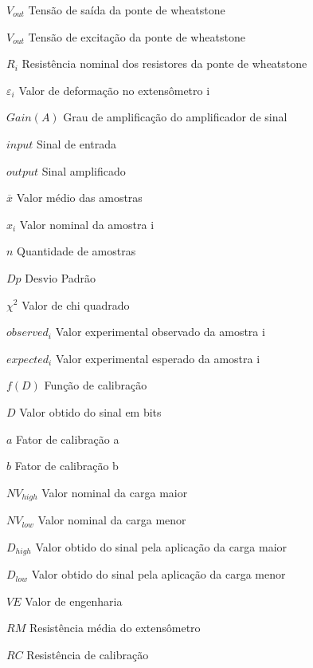 \begin{simbolos}
    \item[$ V_{out} $] {Tensão de saída da ponte de wheatstone}
    \item[$ V_{out} $] {Tensão de excitação da ponte de wheatstone}
    \item[$ R_i $] {Resistência nominal dos resistores da ponte de wheatstone}

    \item[$ \varepsilon_{i} $] {Valor de deformação no extensômetro i}

    \item[$ Gain(A) $] {Grau de amplificação do amplificador de sinal}
    \item[$ input $] {Sinal de entrada}
    \item[$ output $] {Sinal amplificado}

    \item[$ \overline{x} $] {Valor médio das amostras}
    \item[$ x_i $] {Valor nominal da amostra i}
    \item[$ n $] {Quantidade de amostras}

    \item[$ Dp $] {Desvio Padrão}

    \item[$ \chi^{2} $] {Valor de chi quadrado}
    \item[$ observed_i $] {Valor experimental observado da amostra i}
    \item[$ expected_i $] {Valor experimental esperado da amostra i}

    \item[$ f(D) $] {Função de calibração}
    \item[$ D $] {Valor obtido do sinal em bits}
    \item[$ a $] {Fator de calibração a}
    \item[$ b $] {Fator de calibração b}

    \item[$ NV_{high} $] {Valor nominal da carga maior}
    \item[$ NV_{low} $] {Valor nominal da carga menor}
    \item[$ D_{high} $] {Valor obtido do sinal pela aplicação da carga maior}
    \item[$ D_{low} $] {Valor obtido do sinal pela aplicação da carga menor}

    \item[$ VE $] {Valor de engenharia}
    \item[$ RM $] {Resistência média do extensômetro}
    \item[$ RC $] {Resistência de calibração}

\end{simbolos}
